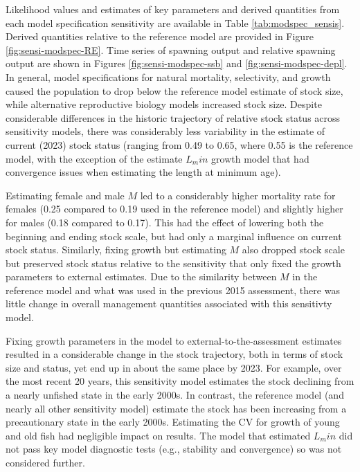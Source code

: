 \documentclass[11pt,
  english,
  letterpaper,
]{article}
\begin{document}
Likelihood values and estimates of key parameters and derived quantities from each model specification sensitivity are available in Table \ref{tab:modspec_sensis}. Derived quantities relative to the reference model are provided in Figure \ref{fig:sensi-modspec-RE}. Time series of spawning output and relative spawning output are shown in Figures \ref{fig:sensi-modspec-ssb} and \ref{fig:sensi-modspec-depl}. In general, model specifications for natural mortality, selectivity, and growth caused the population to drop below the reference model estimate of stock size, while alternative reproductive biology models increased stock size. Despite considerable differences in the historic trajectory of relative stock status across sensitivity models, there was considerably less variability in the estimate of current (2023) stock status (ranging from 0.49 to 0.65, where 0.55 is the reference model, with the exception of the estimate \(L_min\) growth model that had convergence issues when estimating the length at minimum age).

Estimating female and male \(M\) led to a considerably higher mortality rate for females (0.25 compared to 0.19 used in the reference model) and slightly higher for males (0.18 compared to 0.17). This had the effect of lowering both the beginning and ending stock scale, but had only a marginal influence on current stock status. Similarly, fixing growth but estimating \(M\) also dropped stock scale but preserved stock status relative to the sensitivity that only fixed the growth parameters to external estimates. Due to the similarity between \(M\) in the reference model and what was used in the previous 2015 assessment, there was little change in overall management quantities associated with this sensitivty model.

Fixing growth parameters in the model to external-to-the-assessment estimates resulted in a considerable change in the stock trajectory, both in terms of stock size and status, yet end up in about the same place by 2023. For example, over the most recent 20 years, this sensitivity model estimates the stock declining from a nearly unfished state in the early 2000s. In contrast, the reference model (and nearly all other sensitivity model) estimate the stock has been increasing from a precautionary state in the early 2000s. Estimating the CV for growth of young and old fish had negligible impact on results. The model that estimated \(L_min\) did not pass key model diagnostic tests (e.g., stability and convergence) so was not considered further.
\end{document}
